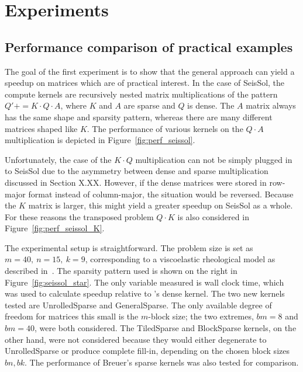 
\chapter{Experiments}
\label{chapter:experiments}


\section{Performance comparison of practical examples}

The goal of the first experiment is to show that the general approach can yield a speedup on matrices which are of practical interest. In the case of SeisSol, the compute kernels are recursively nested matrix multiplications of the pattern $Q' \mathrel{{+}{=}} K \cdot Q \cdot A$, where $K$ and $A$ are sparse and $Q$ is dense. The $A$ matrix always has the same shape and sparsity pattern, whereas there are many different matrices shaped like $K$. The performance of various kernels on the $Q \cdot A$ multiplication is depicted in Figure~\ref{fig:perf_seissol}. 

Unfortunately, the case of the $K \cdot Q$ multiplication can not be simply plugged in to SeisSol due to the asymmetry between dense and sparse multiplication discussed in Section X.XX. However, if the dense matrices were stored in row-major format instead of column-major, the situation would be reversed. Because the $K$ matrix is larger, this might yield a greater speedup on SeisSol as a whole. For these reasons the transposed problem $Q \cdot K$ is also considered in Figure~\ref{fig:perf_seissol_K}.


The experimental setup is straightforward. The problem size is set as $m=40,~n=15,~k=9$, corresponding to a viscoelastic rheological model as described in~\cite{7568431}. The sparsity pattern used is shown on the right in Figure~\ref{fig:seissol_star}. The only variable measured is wall clock time, which was used to calculate speedup relative to 's dense kernel. The two new kernels tested are UnrolledSparse and GeneralSparse. The only available degree of freedom for matrices this small is the $m$-block size; the two extremes, $bm=8$ and $bm=40$, were both considered. The TiledSparse and BlockSparse kernels, on the other hand, were not considered because they would either degenerate to UnrolledSparse or produce complete fill-in, depending on the chosen block sizes $bn, bk$. The performance of Breuer's sparse kernels was also tested for comparison. 



